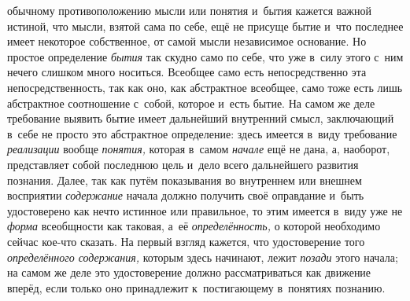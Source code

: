 обычному противоположению мысли или понятия и~бытия кажется важной истиной,
что мысли, взятой сама по себе, ещё не присуще бытие и~что последнее имеет
некоторое собственное, от самой мысли независимое основание. Но простое
определение {\em бытия}
так скудно само по себе, что уже в~силу этого с~ним нечего
слишком много носиться. Всеобщее само есть непосредственно эта
непосредственность, так как оно, как абстрактное всеобщее, само тоже есть
лишь абстрактное соотношение с~собой, которое и~есть бытие. На самом же
деле требование выявить бытие имеет дальнейший внутренний
смысл, заключающий в~себе не просто это абстрактное определение: здесь
имеется в~виду требование {\em реализации} вообще
{\em понятия,} которая в~самом {\em начале} ещё не
дана, а, наоборот, представляет собой последнюю цель и~дело всего
дальнейшего развития познания. Далее, так как путём показывания во
внутреннем или внешнем восприятии {\em содержание} начала
должно получить своё оправдание и~быть удостоверено как нечто истинное или
правильное, то этим имеется в~виду уже не
{\em форма} всеобщности
как таковая, а~её {\em определённость,}
о которой необходимо сейчас кое-что сказать. На первый взгляд
кажется, что удостоверение того {\em определённого содержания,}
которым здесь начинают, лежит {\em позади} этого начала;
на самом же деле это удостоверение должно рассматриваться как движение
вперёд, если только оно принадлежит к~постигающему в~понятиях познанию.

